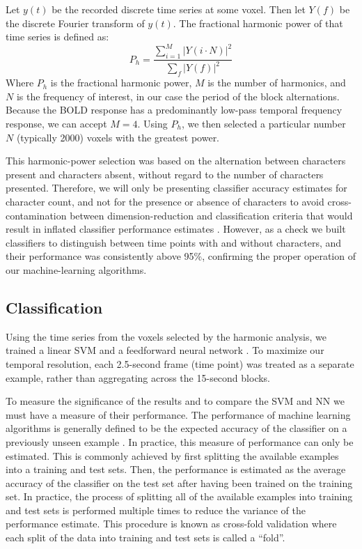 \documentclass{article}
\begin{document}
Let $y(t)$ be the recorded discrete time series at some voxel.
Then let $Y(f)$ be the discrete Fourier transform of $y(t)$.
The fractional harmonic power of that time series is defined as:
\begin{equation}
P_h = \frac{\sum_{i = 1}^{M}{\left|Y(i \cdot N)\right|^{2}}}{\sum_{f}{\left|Y(f)\right|^{2}}}
\end{equation}
Where $P_h$ is the fractional harmonic power, $M$ is the number of harmonics, and $N$ is the frequency of interest, in our case the period of the block alternations. 
Because the BOLD response has a predominantly low-pass temporal frequency response, we can accept $M = 4$. 
Using $P_h$, we then selected a particular number $N$ (typically 2000) voxels with the greatest power. 

This harmonic-power selection was based on the alternation between characters present and characters absent, without regard to the number of characters presented. 
Therefore, we will only be presenting classifier accuracy estimates for character count, and not for the presence or absence of characters to avoid cross-contamination between dimension-reduction and  classification criteria that would result in inflated classifier performance estimates \citep{Pereira2009}.
However, as a check we built classifiers to distinguish between time points with and without characters, and their performance was consistently above 95\%, confirming the proper operation of our machine-learning algorithms.

\subsection{Classification}
Using the time series from the voxels selected by the harmonic analysis, we trained a linear SVM \citep{Cortes1995} and a feedforward neural network \citep{Hornik1989,Hagan1994}.
To maximize our temporal resolution, each 2.5-second frame (time point) was treated as a separate example, rather than aggregating across the 15-second blocks.

To measure the significance of the results and to compare the SVM and NN we must have a measure of their performance.
The performance of machine learning algorithms is generally defined to be the expected accuracy of the classifier on a previously unseen example \citep{Bishop2006}.
In practice, this measure of performance can only be estimated.
This is commonly achieved by first splitting the available examples into a training and test sets.
Then, the performance is estimated as the average accuracy of the classifier on the test set after having been trained on the training set.
In practice, the process of splitting all of the available examples into training and test sets is performed multiple times to reduce the variance of the performance estimate.
This procedure is known as cross-fold validation \citep{Kohavi1995} where each split of the data into training and test sets is called a ``fold''.
\end{document}

